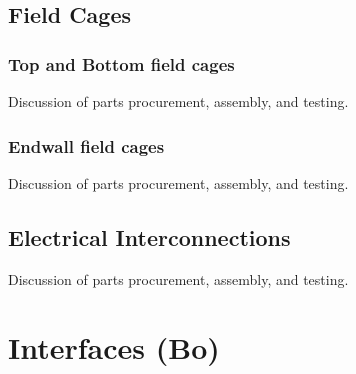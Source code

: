 \subsection{Field Cages}

%

\subsubsection{Top and Bottom field cages}
Discussion of parts procurement, assembly, and testing.

\subsubsection{Endwall field cages}
Discussion of parts procurement, assembly, and testing.


\subsection{Electrical Interconnections}

Discussion of parts procurement, assembly, and testing.



\section{Interfaces (Bo)}
\label{sec:fddp-hv-intfc}
%
%
%
%
%
%
%
%
%
%
%
%
